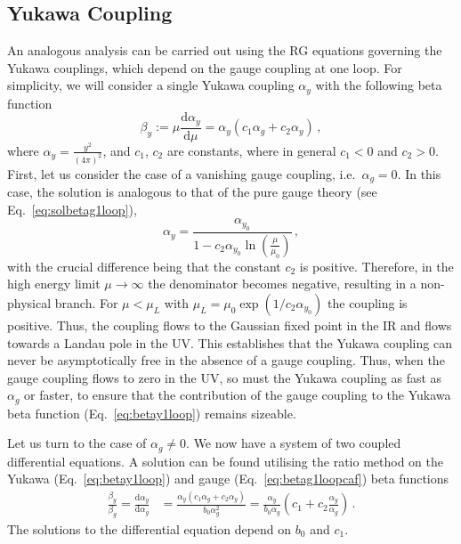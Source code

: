 \subsection{Yukawa Coupling }\label{sec:CAFYukawa}
An analogous analysis can be carried out using the RG equations governing the Yukawa couplings, which depend on the gauge coupling at one loop. For simplicity, we will consider a single Yukawa coupling $\alpha_y$ with the following beta function
\begin{equation}
    \beta_y:=\mu \frac{\text{d}\alpha_y}{\text{d}\mu}=\alpha_y(c_1\alpha_g+c_2\alpha_y)\,,\label{eq:betay1loop}
\end{equation}
where $\alpha_y=\frac{y^2}{(4\pi)^2}$, and $c_1$, $c_2$ are constants, where in general $c_1<0$ and $c_2>0$. First, let us consider the case of a vanishing gauge coupling, i.e.\ $\alpha_g=0$. In this case, the solution is analogous to that of the pure gauge theory (see Eq.~\eqref{eq:solbetag1loop}), 
\begin{equation}
    \alpha_y=\frac{\alpha_{y_0}}{1-c_2 \alpha_{y_0} \ln \left(\frac{\mu}{\mu_0 }\right)}\,,
\end{equation}
with the crucial difference being that the constant $c_2$ is positive. Therefore, in the high energy limit $\mu\to\infty$ the denominator becomes negative, resulting in a non-physical branch. For $\mu<\mu_L$ with $\mu_L=\mu_0\exp(1/{c_2\alpha_{y_0}})$ the coupling is positive. Thus, the coupling flows to the Gaussian fixed point in the IR and flows towards a Landau pole in the UV. This establishes that the Yukawa coupling can never be asymptotically free in the absence of a gauge coupling. Thus, when the gauge coupling flows to zero in the UV, so must the Yukawa coupling as fast as $\alpha_g$ or faster, to ensure that the contribution of the gauge coupling to the Yukawa beta function (Eq.~\eqref{eq:betay1loop}) remains sizeable. 

Let us turn to the case of $\alpha_g\neq0$. We now have a system of two coupled differential equations. A solution can be found utilising the ratio method \cite{Pendleton:1980as} on the Yukawa (Eq.~\eqref{eq:betay1loop}) and gauge (Eq.~\eqref{eq:betag1loopcaf}) beta functions 
\begin{align}
    \frac{\beta_y}{\beta_g}=\frac{\text{d}\alpha_y}{\text{d}\alpha_g}&= \frac{\alpha_y(c_1 \alpha_g + c_2 \alpha_y)}{b_0 \alpha_g^2} = \frac{\alpha_y}{b_0 \alpha_g} \left( c_1 + c_2 \frac{\alpha_y}{\alpha_g} \right)\,.\label{eq:betayfrac}
\end{align}
The solutions to the differential equation depend on $b_0$ and $c_1$. 

